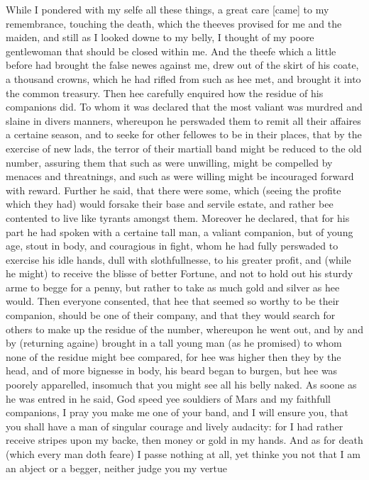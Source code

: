 While I pondered with my selfe all these things, a great care [came] to my
remembrance, touching the death, which the theeves provised for me and the
maiden, and still as I looked downe to my belly, I thought of my poore
gentlewoman that should be closed within me. And the theefe which a little
before had brought the false newes against me, drew out of the skirt of his
coate, a thousand crowns, which he had rifled from such as hee met, and brought
it into the common treasury. Then hee carefully enquired how the residue of his
companions did. To whom it was declared that the most valiant was murdred and
slaine in divers manners, whereupon he perswaded them to remit all their
affaires a certaine season, and to seeke for other fellowes to be in their
places, that by the exercise of new lads, the terror of their martiall band
might be reduced to the old number, assuring them that such as were unwilling,
might be compelled by menaces and threatnings, and such as were willing might
be incouraged forward with reward. Further he said, that there were some, which
(seeing the profite which they had) would forsake their base and servile
estate, and rather bee contented to live like tyrants amongst them. Moreover he
declared, that for his part he had spoken with a certaine tall man, a valiant
companion, but of young age, stout in body, and couragious in fight, whom he
had fully perswaded to exercise his idle hands, dull with slothfullnesse, to
his greater profit, and (while he might) to receive the blisse of better
Fortune, and not to hold out his sturdy arme to begge for a penny, but rather
to take as much gold and silver as hee would. Then everyone consented, that hee
that seemed so worthy to be their companion, should be one of their company,
and that they would search for others to make up the residue of the number,
whereupon he went out, and by and by (returning againe) brought in a tall young
man (as he promised) to whom none of the residue might bee compared, for hee
was higher then they by the head, and of more bignesse in body, his beard began
to burgen, but hee was poorely apparelled, insomuch that you might see all his
belly naked. As soone as he was entred in he said, God speed yee souldiers of
Mars and my faithfull companions, I pray you make me one of your band, and I
will ensure you, that you shall have a man of singular courage and lively
audacity: for I had rather receive stripes upon my backe, then money or gold in
my hands. And as for death (which every man doth feare) I passe nothing at all,
yet thinke you not that I am an abject or a begger, neither judge you my vertue
